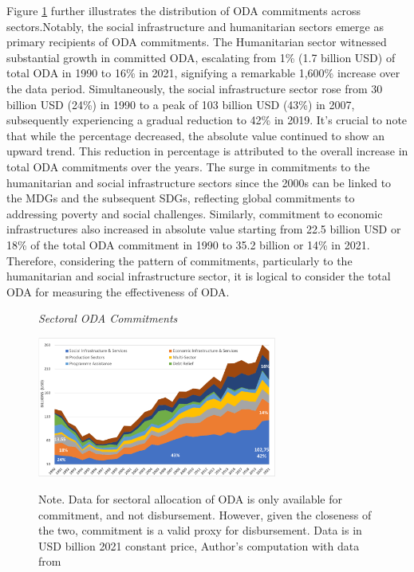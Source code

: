  Figure \ref{fig:ODA sectors commitment} further illustrates the distribution of ODA commitments across sectors.Notably, the social infrastructure and humanitarian sectors emerge as primary recipients of ODA commitments. The Humanitarian sector witnessed substantial growth in committed ODA, escalating from 1\% (1.7 billion USD) of total ODA in 1990 to 16\% in 2021, signifying a remarkable 1,600\% increase over the data period. Simultaneously, the social infrastructure sector rose from 30 billion USD (24\%) in 1990 to a peak of 103 billion USD (43\%) in 2007, subsequently experiencing a gradual reduction to 42\% in 2019. It's crucial to note that while the percentage decreased, the absolute value continued to show an upward trend. This reduction in percentage is attributed to the overall increase in total ODA commitments over the years. The surge in commitments to the humanitarian and social infrastructure sectors since the 2000s can be linked to the MDGs and the subsequent SDGs, reflecting global commitments to addressing poverty and social challenges. Similarly, commitment to economic infrastructures also increased in absolute value starting from 22.5 billion USD or 18\% of the total ODA commitment in 1990 to 35.2 billion or 14\% in 2021. Therefore, considering the pattern of commitments, particularly to the humanitarian and social infrastructure sector, it is logical to consider the total ODA for measuring the effectiveness of ODA.

\begin{figure}[ht]
\captionsetup{justification=justified,singlelinecheck=false}
\caption{\textit{Sectoral ODA Commitments}}
    \centering \includegraphics[width = 0.7\textwidth]{Figures/ODA_Graphs/Sector_class.pdf}
    \label{fig:ODA sectors commitment}
    \caption*{\footnotesize{Note. Data for sectoral allocation of ODA is only available for commitment, and not disbursement. However, given the closeness of the two, commitment is a valid proxy for disbursement. Data is in USD billion 2021 constant price, Author's computation with data from \textcite{oecd_Data_2023}}}
\end{figure}


